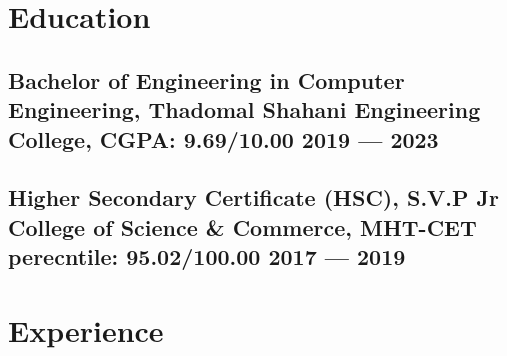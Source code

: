 \documentclass[a4,10pt]{article}
\newcommand{\subtext}[1]{
#1\par\vspace{-0.2cm}}
\newcommand{\hskills}[1]{
\textbf{\bfseries #1} }
\begin{document}


\section{Education }
\subsection*{Bachelor of Engineering in Computer Engineering, {\normalsize \normalfont Thadomal Shahani Engineering College, CGPA: \textbf{9.69}/10.00} \hfill 2019 --- 2023} 
\vspace{0.1cm}
\subsection*{Higher Secondary Certificate (HSC), {\normalsize \normalfont S.V.P Jr College of Science \& Commerce, MHT-CET perecntile: 95.02/100.00} \hfill 2017 --- 2019} 
\vspace{0.2cm}


\section{Experience}

        
\end{document}
